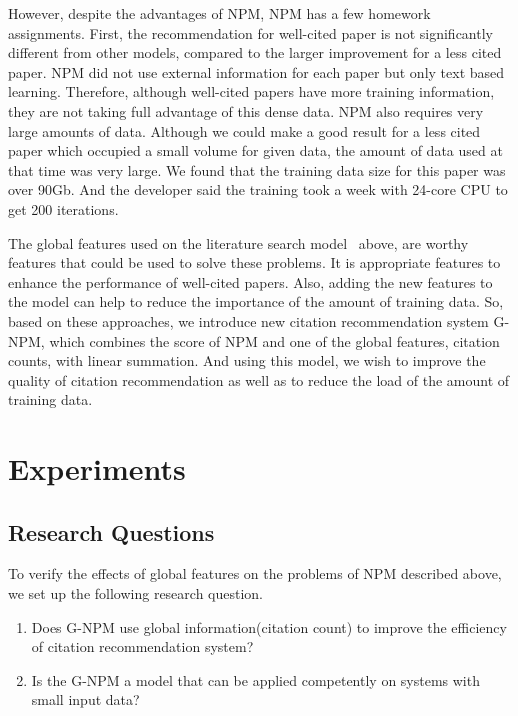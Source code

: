 \documentclass{llncs}
\begin{document}
However, despite the advantages of NPM, NPM has a few homework assignments. First, the recommendation for well-cited paper is not significantly different from other models, compared to the larger improvement for a less cited paper. NPM did not use external information for each paper but only text based learning. Therefore, although well-cited papers have more training information, they are not taking full advantage of this dense data. NPM also requires very large amounts of data. Although we could make a good result for a less cited paper which occupied a small volume for given data, the amount of data used at that time was very large. We found that the training data size for this paper was over 90Gb. And the developer said the training took a week with 24-core CPU to get 200 iterations.

The global features used on the literature search model~\cite{Bethard:2010:ICL:1871437.1871517} above, are worthy features that could be used to solve these problems. It is appropriate features to enhance the performance of well-cited papers. Also, adding the new features to the model can help to reduce the importance of the amount of training data. So, based on these approaches, we introduce new citation recommendation system G-NPM, which combines the score of NPM and one of the global features, citation counts, with linear summation. And using this model, we wish to improve the quality of citation recommendation as well as to reduce the load of the amount of training data.

\section{Experiments}
\subsection{Research Questions}

To verify the effects of global features on the problems of NPM described above, we set up the following research question.
\begin{enumerate}
\item Does G-NPM use global information(citation count) to improve the efficiency of citation recommendation system?
\item Is the G-NPM a model that can be applied competently on systems with small input data?
\end{enumerate}
\end{document}
